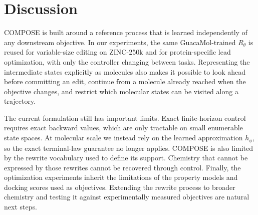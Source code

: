 \section{Discussion}
\label{sec:discussion}

COMPOSE is built around a reference process that is learned independently of any
downstream objective. In our experiments, the same GuacaMol-trained $R_\theta$ is
reused for variable-size editing on ZINC-250k and for protein-specific lead
optimization, with only the controller changing between tasks. Representing the
intermediate states explicitly as molecules also makes it possible to look ahead
before committing an edit, continue from a molecule already reached when the
objective changes, and restrict which molecular states can be visited along a
trajectory.

The current formulation still has important limits. Exact finite-horizon control
requires exact backward values, which are only tractable on small enumerable
state spaces. At molecular scale we instead rely on the learned approximation
$h_\phi$, so the exact terminal-law guarantee no longer applies. COMPOSE is also
limited by the rewrite vocabulary used to define its support. Chemistry that
cannot be expressed by those rewrites cannot be recovered through control.
Finally, the optimization experiments inherit the limitations of the property
models and docking scores used as objectives. Extending the rewrite process to
broader chemistry and testing it against experimentally measured objectives are
natural next steps.

